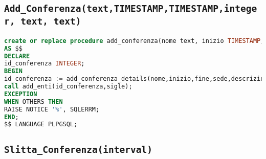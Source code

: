 \subsection{\texttt{Add\_Conferenza(text,TIMESTAMP,TIMESTAMP,integer, text, text)}}
\begin{lstlisting}[language=SQL,style=mystyle]
create or replace procedure add_conferenza(nome text, inizio TIMESTAMP, fine TIMESTAMP, sede INTEGER, descrizione text, sigle text)
AS $$
DECLARE
id_conferenza INTEGER;
BEGIN
id_conferenza := add_conferenza_details(nome,inizio,fine,sede,descrizione);
call add_enti(id_conferenza,sigle);
EXCEPTION
WHEN OTHERS THEN
RAISE NOTICE '%', SQLERRM;
END;
$$ LANGUAGE PLPGSQL;
\end{lstlisting}
\subsection{\texttt{Slitta\_Conferenza(interval)}}
